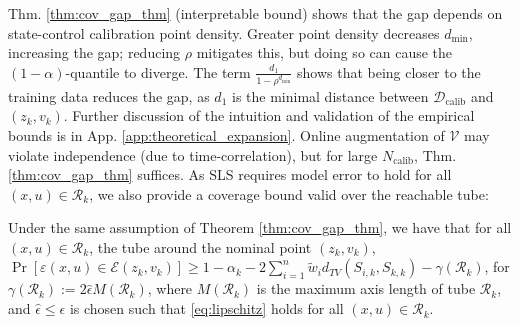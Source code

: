 \documentclass{l4dc2026}
\newcommand{\calib}{\mathcal{D}_{\mathrm{calib}}}
\newcommand{\red}[1]{{\color{red}{#1}}}
\renewcommand{\red}[1]{{\color{red}{#1}}}
\begin{document}
\noindent Thm. \ref{thm:cov_gap_thm} (interpretable bound) shows that the gap depends on state-control calibration point density. Greater point density decreases $d_\text{min}$, increasing the gap; reducing $\rho$ mitigates this, but doing so can cause the $(1-\alpha)$-quantile to diverge. The term $\frac{d_1}{1 - \rho^{d_\text{min}}}$ shows that being closer to the training data reduces the gap, as $d_1$ is the minimal distance between $\calib$ and $(z_k,v_k)$. Further discussion of the intuition and validation of the empirical bounds is in App. \ref{app:theoretical_expansion}. Online augmentation of $\mathcal{V}$ may violate independence (due to time-correlation), but for large $N_\textrm{calib}$, Thm. \ref{thm:cov_gap_thm} suffices. As SLS requires model error to hold for all $(x,u) \in \mathcal{R}_k$, we also provide a coverage bound valid over the reachable tube:
\begin{theorem}\label{thm:tube_gap}
Under the same assumption of Theorem \ref{thm:cov_gap_thm}, we have that for all $(x,u) \in \mathcal{R}_k$, the tube around the nominal point $(z_k,v_k)$, 
    $\Pr[\varepsilon(x,u) \in \mathcal{E}(z_k,v_k)] \geq 1-\alpha_k- 2\sum_{i=1}^{n} \tilde{w}_i d_{TV}(S_{i,k}, S_{k,k})- \gamma({\mathcal{R}_k})$,
for $ \gamma({\mathcal{R}_k}) := 2\hat{\epsilon}M(\mathcal{R}_k) $, where $M(\mathcal{R}_k)$ is the maximum axis length of tube $\mathcal{R}_k$, and $\hat \epsilon \le \epsilon$ is chosen such that \eqref{eq:lipschitz} holds for all $(x, u) \in \mathcal{R}_k$.%
\end{theorem}
\end{document}
